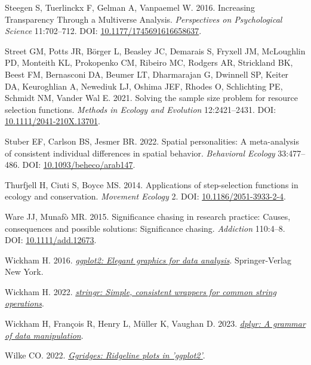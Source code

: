 \documentclass[10pt,a4paper]{article}
\newlength{\cslhangindent}
\newenvironment{CSLReferences}[2] %
 {\begin{list}{}{%
  \setlength{\itemindent}{0pt}
  \setlength{\leftmargin}{0pt}
  \setlength{\parsep}{0pt}
  \ifodd #1
   \setlength{\leftmargin}{\cslhangindent}
   \setlength{\itemindent}{-1\cslhangindent}
  \fi
  \setlength{\itemsep}{#2\baselineskip}}}
 {\end{list}}
\begin{document}
\begin{CSLReferences}{1}{0}
Steegen S, Tuerlinckx F, Gelman A, Vanpaemel W. 2016. Increasing {Transparency} {Through} a {Multiverse} {Analysis}. \emph{Perspectives on Psychological Science} 11:702--712. DOI: \href{https://doi.org/10.1177/1745691616658637}{10.1177/1745691616658637}.

Street GM, Potts JR, Börger L, Beasley JC, Demarais S, Fryxell JM, McLoughlin PD, Monteith KL, Prokopenko CM, Ribeiro MC, Rodgers AR, Strickland BK, Beest FM, Bernasconi DA, Beumer LT, Dharmarajan G, Dwinnell SP, Keiter DA, Keuroghlian A, Newediuk LJ, Oshima JEF, Rhodes O, Schlichting PE, Schmidt NM, Vander Wal E. 2021. Solving the sample size problem for resource selection functions. \emph{Methods in Ecology and Evolution} 12:2421--2431. DOI: \href{https://doi.org/10.1111/2041-210X.13701}{10.1111/2041-210X.13701}.

Stuber EF, Carlson BS, Jesmer BR. 2022. Spatial personalities: A meta-analysis of consistent individual differences in spatial behavior. \emph{Behavioral Ecology} 33:477--486. DOI: \href{https://doi.org/10.1093/beheco/arab147}{10.1093/beheco/arab147}.

Thurfjell H, Ciuti S, Boyce MS. 2014. Applications of step-selection functions in ecology and conservation. \emph{Movement Ecology} 2. DOI: \href{https://doi.org/10.1186/2051-3933-2-4}{10.1186/2051-3933-2-4}.

Ware JJ, Munafò MR. 2015. Significance chasing in research practice: Causes, consequences and possible solutions: {Significance} chasing. \emph{Addiction} 110:4--8. DOI: \href{https://doi.org/10.1111/add.12673}{10.1111/add.12673}.

Wickham H. 2016. \emph{\href{https://ggplot2.tidyverse.org}{ggplot2: Elegant graphics for data analysis}}. Springer-Verlag New York.

Wickham H. 2022. \emph{\href{https://CRAN.R-project.org/package=stringr}{{stringr}: Simple, consistent wrappers for common string operations}}.

Wickham H, François R, Henry L, Müller K, Vaughan D. 2023. \emph{\href{https://CRAN.R-project.org/package=dplyr}{{dplyr}: A grammar of data manipulation}}.

Wilke CO. 2022. \emph{\href{https://CRAN.R-project.org/package=ggridges}{Ggridges: Ridgeline plots in 'ggplot2'}}.


\end{CSLReferences}
\end{document}
